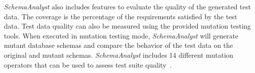 \textit{SchemaAnalyst} also includes features to evaluate the quality of the generated test data. The
coverage is the percentage of the requirements satisfied by the test data. 
Test data quality can also be measured using the provided mutation testing tools. When executed in
mutation testing mode, \textit{SchemaAnalyst} will generate mutant database schemas and compare the
behavior of the test data on the original and mutant schemas. \textit{SchemaAnalyst} includes 14
different mutation operators that can be used to assess test suite quality~\cite{wright2015mutation}.


